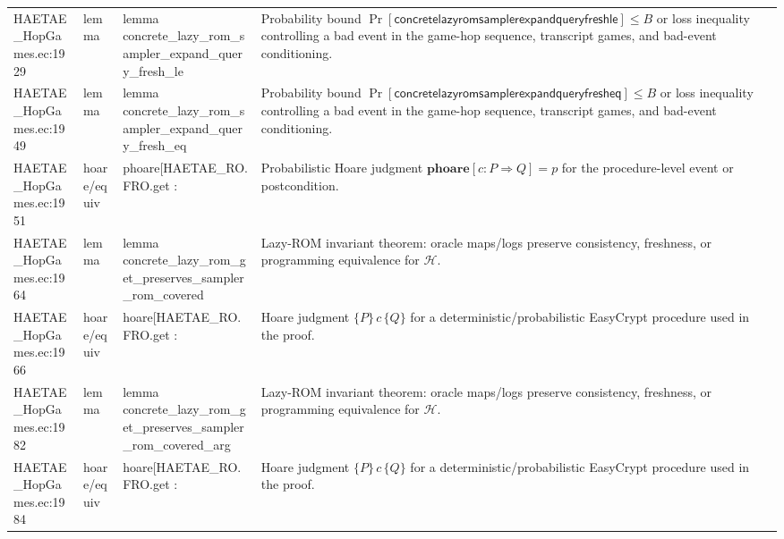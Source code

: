 \documentclass[10pt]{article}
\begin{document}
\begin{longtable}{L{0.11\textwidth}L{0.055\textwidth}L{0.385\textwidth}L{0.41\textwidth}}
HAETAE\_\allowbreak{}HopGames.\allowbreak{}ec:\allowbreak{}1929 & lemma & {\ttfamily\scriptsize lemma concrete\_\allowbreak{}lazy\_\allowbreak{}rom\_\allowbreak{}sampler\_\allowbreak{}expand\_\allowbreak{}query\_\allowbreak{}fresh\_\allowbreak{}le} & Probability bound $\Pr[\mathsf{concretelazyromsamplerexpandqueryfreshle}]\le B$ or loss inequality controlling a bad event in the game-hop sequence, transcript games, and bad-event conditioning. \\
HAETAE\_\allowbreak{}HopGames.\allowbreak{}ec:\allowbreak{}1949 & lemma & {\ttfamily\scriptsize lemma concrete\_\allowbreak{}lazy\_\allowbreak{}rom\_\allowbreak{}sampler\_\allowbreak{}expand\_\allowbreak{}query\_\allowbreak{}fresh\_\allowbreak{}eq} & Probability bound $\Pr[\mathsf{concretelazyromsamplerexpandqueryfresheq}]\le B$ or loss inequality controlling a bad event in the game-hop sequence, transcript games, and bad-event conditioning. \\
HAETAE\_\allowbreak{}HopGames.\allowbreak{}ec:\allowbreak{}1951 & hoare/equiv & {\ttfamily\scriptsize phoare[HAETAE\_\allowbreak{}RO.FRO.get :} & Probabilistic Hoare judgment $\mathbf{phoare}[c:P\Rightarrow Q]=p$ for the procedure-level event or postcondition. \\
HAETAE\_\allowbreak{}HopGames.\allowbreak{}ec:\allowbreak{}1964 & lemma & {\ttfamily\scriptsize lemma concrete\_\allowbreak{}lazy\_\allowbreak{}rom\_\allowbreak{}get\_\allowbreak{}preserves\_\allowbreak{}sampler\_\allowbreak{}rom\_\allowbreak{}covered} & Lazy-ROM invariant theorem: oracle maps/logs preserve consistency, freshness, or programming equivalence for $\mathcal H$. \\
HAETAE\_\allowbreak{}HopGames.\allowbreak{}ec:\allowbreak{}1966 & hoare/equiv & {\ttfamily\scriptsize hoare[HAETAE\_\allowbreak{}RO.FRO.get :} & Hoare judgment $\{P\}\,c\,\{Q\}$ for a deterministic/probabilistic EasyCrypt procedure used in the proof. \\
HAETAE\_\allowbreak{}HopGames.\allowbreak{}ec:\allowbreak{}1982 & lemma & {\ttfamily\scriptsize lemma concrete\_\allowbreak{}lazy\_\allowbreak{}rom\_\allowbreak{}get\_\allowbreak{}preserves\_\allowbreak{}sampler\_\allowbreak{}rom\_\allowbreak{}covered\_\allowbreak{}arg} & Lazy-ROM invariant theorem: oracle maps/logs preserve consistency, freshness, or programming equivalence for $\mathcal H$. \\
HAETAE\_\allowbreak{}HopGames.\allowbreak{}ec:\allowbreak{}1984 & hoare/equiv & {\ttfamily\scriptsize hoare[HAETAE\_\allowbreak{}RO.FRO.get :} & Hoare judgment $\{P\}\,c\,\{Q\}$ for a deterministic/probabilistic EasyCrypt procedure used in the proof. \\

\end{longtable}
\end{document}
